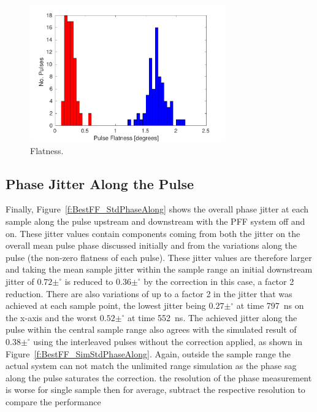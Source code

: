 \begin{figure}
  \centering
  \includegraphics[width=0.75\textwidth]{Figures/feedforward/BestFF_Flatness}
  \caption{Flatness.}
  \label{f:BestFF_Flatness}
\end{figure}

\subsection{Phase Jitter Along the Pulse}
\label{ss:bestJitterAlong}

Finally, Figure~\ref{f:BestFF_StdPhaseAlong} shows the overall phase jitter at each 
sample along the pulse upstream and downstream with the PFF system off and on. These 
jitter values contain components coming from both the jitter on the overall mean pulse 
phase discussed initially and from the variations along the pulse (the non-zero flatness of each pulse). 
These jitter values are therefore larger and taking the mean sample 
jitter within the sample range an initial downstream jitter of \(0.72\pm^\circ\) is 
reduced to \(0.36\pm^\circ\) by the correction in this case, a factor 2 reduction. 
There are also variations of up to a factor 2 in the jitter that was achieved at each sample 
point, the lowest jitter being \(0.27\pm^\circ\) at time 797~ns on the x-axis and the 
worst \(0.52\pm^\circ\) at time 552~ns. The achieved jitter along the pulse within the 
central sample range also agrees with the simulated result of \(0.38\pm^\circ\) using 
the interleaved pulses without the correction applied, as shown in Figure~\ref{f:BestFF_SimStdPhaseAlong}. 
Again, outside the sample range the actual system can 
not match the unlimited range simulation as the phase sag along the pulse saturates the 
correction. 
{\color{red} the resolution of the phase measurement is worse for single sample then for average,
subtract the respective resolution to compare the performance}



